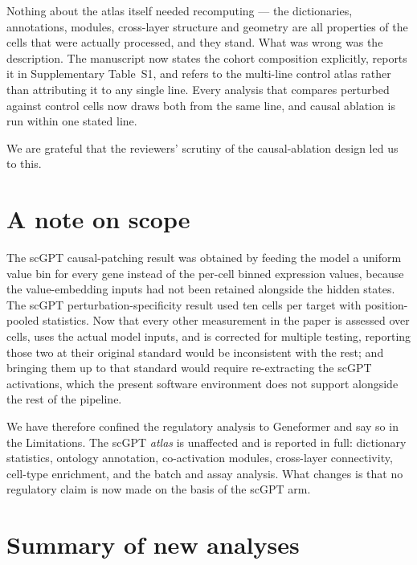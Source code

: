 \documentclass[11pt]{article}
\begin{document}
Nothing about the atlas itself needed recomputing --- the dictionaries, annotations, modules,
cross-layer structure and geometry are all properties of the cells that were actually processed,
and they stand. What was wrong was the description. The manuscript now states the cohort
composition explicitly, reports it in Supplementary Table~S1, and refers to the multi-line control
atlas rather than attributing it to any single line. Every analysis that compares perturbed against
control cells now draws both from the same line, and causal ablation is run within one stated line.

We are grateful that the reviewers' scrutiny of the causal-ablation design led us to this.

\section*{A note on scope}

The scGPT causal-patching result was obtained by feeding the model a uniform value bin for every
gene instead of the per-cell binned expression values, because the value-embedding inputs had not
been retained alongside the hidden states. The scGPT perturbation-specificity result used ten cells
per target with position-pooled statistics. Now that every other measurement in the paper is
assessed over cells, uses the actual model inputs, and is corrected for multiple testing, reporting
those two at their original standard would be inconsistent with the rest; and bringing them up to
that standard would require re-extracting the scGPT activations, which the present software
environment does not support alongside the rest of the pipeline.

We have therefore confined the regulatory analysis to Geneformer and say so in the Limitations. The
scGPT \emph{atlas} is unaffected and is reported in full: dictionary statistics, ontology
annotation, co-activation modules, cross-layer connectivity, cell-type enrichment, and the batch
and assay analysis. What changes is that no regulatory claim is now made on the basis of the scGPT
arm.

\section*{Summary of new analyses}
\end{document}
